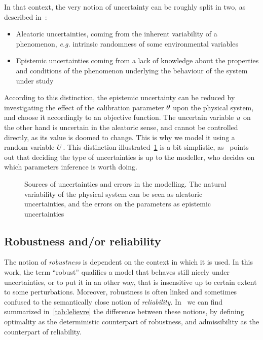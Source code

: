 \documentclass[../../Main_ManuscritThese.tex]{subfiles}
\begin{document}
In that context, the very notion of uncertainty can be roughly split in two, as described in~\cite{walker_defining_2003}:
\begin{itemize}
\item Aleatoric uncertainties, coming from the inherent variability of a phenomenon, \emph{e.g.} intrinsic randomness of some environmental variables
\item Epistemic uncertainties coming from a lack of knowledge about the properties and conditions of the phenomenon underlying the behaviour of the system under study
\end{itemize}
According to this distinction,  the epistemic uncertainty can be reduced by investigating the effect of the calibration parameter $\theta$ upon the physical system, and choose it accordingly to an objective function.
The uncertain variable $u$ on the other hand is uncertain in the aleatoric sense, and cannot be controlled directly, as its value is doomed to change. This is why we model it using a random variable $U$. This distinction illustrated~\cref{fig:sources_uncertainties} is a bit simplistic, as~\cite{kiureghian_aleatory_2009} points out that deciding the type of uncertainties is up to the modeller, who decides on which parameters inference is worth doing.

\begin{figure}[ht]
  \begin{center}
  \resizebox{\linewidth}{!}
  {
      
    }
    \end{center}
  \caption[Sources of uncertainties and errors in the modelling]{\label{fig:sources_uncertainties} Sources of uncertainties and errors in the modelling. The natural variability of the physical system can be seen as aleatoric uncertainties, and the errors on the parameters as epistemic uncertainties}
\end{figure}

\subsection{Robustness and/or reliability}
The notion of \emph{robustness} is dependent on the context in which it is used. In this work, the term ``robust'' qualifies a model that behaves still nicely under uncertainties, or to put it in an other way, that is insensitive up to certain extent to some perturbations.
Moreover, robustness is often linked and sometimes confused to the semantically close notion of \emph{reliability}. In~\cite{lelievre_consideration_2016} we can find summarized in~\cref{tab:lelievre} the difference between these notions, by defining optimality as the deterministic counterpart of robustness, and admissibility as the counterpart of reliability.
\end{document}
